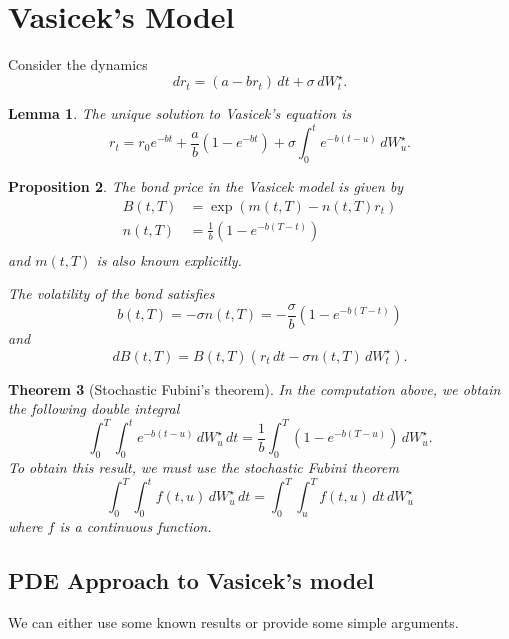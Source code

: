 \documentclass[10pt, oneside, reqno]{amsbook}
\theoremstyle{plain}%
\newtheorem{thm}{Theorem}[chapter]
\newtheorem{lem}[thm]{Lemma}
\newtheorem{prop}[thm]{Proposition}
\theoremstyle{definition}
\theoremstyle{remark}
\numberwithin{equation}{chapter}
\begin{document}
\section{Vasicek's Model} %
\label{sub:vasicek_s_model}
Consider the dynamics \begin{equation}
	dr_t = (a - br_t) \, dt + \sigma \, dW^\star_t.
	\label{eq:vasicek_short_rate_dynamics}
\end{equation}

\begin{lem}
	The unique solution to Vasicek's equation is \begin{equation}
		r_t = r_0 e^{-bt} + \frac{a}{b}\left(1-e^{-bt} \right) + \sigma \int_0^t e^{-b(t-u)} \, dW^\star_u.
	\end{equation}
\end{lem}

\begin{prop}
	The bond price in the Vasicek model is given by \begin{align*}
		B(t, T) &= \exp(m(t, T) - n(t, T) r_t) \\
		n(t, T) &= \frac{1}{b}\left(1- e^{-b(T-t)} \right) \\
	\end{align*} and $m(t, T)$ is also known explicitly.
	
	The volatility of the bond satisfies \[
		b(t, T) = -\sigma n(t, T) = -\frac{\sigma}{b}\left(1 -e^{-b(T-t)} \right)
	\] and \[
		dB(t, T) = B(t, T) \left(r_t \, dt - \sigma n(t, T) \, dW^\star_t \right).
	\]
\end{prop}

\begin{thm}[Stochastic Fubini's theorem]
	In the computation above, we obtain the following double integral \[
		\int_0^T \int_0^t e^{-b(t-u)} \, dW^\star_u \, dt = \frac{1}{b} \int_0^T \left(1-e^{-b(T-u)} \right) \, dW^\star_u.
	\]   To obtain this result, we must use the stochastic Fubini theorem \[
		\int_0^T \int_0^t f(t, u) \, dW^\star_u \, dt = \int_0^T \int_u^T f(t, u) \, dt \, dW^\star_u
	\] where $f$ is a continuous function.

\end{thm}

\subsection{PDE Approach to Vasicek's model} %
\label{sub:pde_approach_to_vasicek_s_model}
We can either use some known results or provide some simple arguments.  
\end{document}
